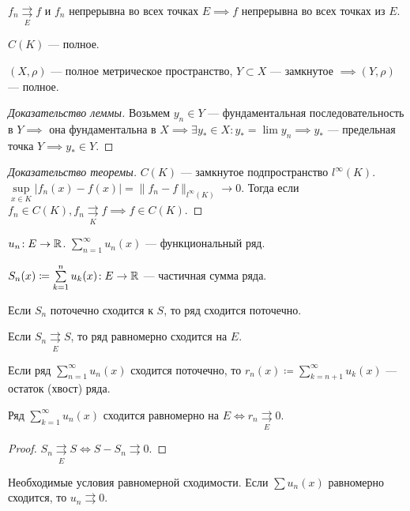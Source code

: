 \begin{consequence}
    $f_n \underset{E}{\rightrightarrows} f$ и  $f_n$ непрерывна во всех точках  $E \implies f$ непрерывна во всех точках из  $E$.
\end{consequence}
\begin{theorem}
    $C(K)$ --- полное.
\end{theorem}
\begin{lemma}
    $(X, \rho)$ --- полное метрическое пространство, $Y \subset X$ --- замкнутое  $\implies (Y, \rho)$ --- полное. 
\end{lemma}
\begin{proof}[Доказательство леммы]
    Возьмем $y_n \in Y$ --- фундаментальная последовательность в  $Y \implies$ она фундаментальна в $X \implies \exists y_* \in X\!: y_* = \lim y_n \implies y_*$ ---  предельная точка  $Y \implies y_* \in Y$.
\end{proof}
\begin{proof}[Доказательство теоремы]
    $C(K)$ --- замкнутое подпространство  $l^\infty(K)$.  $\sup\limits_{x \in K}|f_n(x) - f(x)| =\|f_n - f\|_{l^\infty(K)} \to 0$. Тогда если $f_n \in C(K), f_n \underset{K}{\rightrightarrows} f \implies f \in C(K)$.
\end{proof}
\begin{definition}
    $u_n\!: E \to \mathbb{R}$.  $\sum\limits_{n=1}^\infty u_n(x)$ --- функциональный ряд.

     $S_n(x) \coloneqq \sum\limits_{k=1}^n u_k(x)\!: E \to \mathbb{R}$ --- частичная сумма ряда.

     Если  $S_n$ поточечно сходится к  $S$, то ряд сходится поточечно.

     Если $S_n \underset{E}{\rightrightarrows} S$, то ряд равномерно сходится на  $E$.
\end{definition}
\begin{definition}
    Если ряд $\sum\limits_{n=1}^\infty u_n(x)$ сходится поточечно, то  $r_n(x) \coloneqq \sum\limits_{k=n+1}^\infty u_k(x)$ --- остаток (хвост) ряда.
\end{definition}
\begin{theorem}
    Ряд $\sum\limits_{k=1}^\infty u_n(x)$ сходится равномерно на  $E \iff r_n \underset{E}{\rightrightarrows} 0$.
\end{theorem}
\begin{proof}
    $S_n \underset{E}{\rightrightarrows} S \iff S - S_n \rightrightarrows 0$.
\end{proof}
\begin{remark}
    Необходимые условия равномерной сходимости. Если $\sum u_n(x)$ равномерно сходится, то  $u_n \rightrightarrows 0$.
\end{remark}
